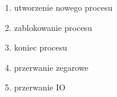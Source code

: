 \begin{enumerate}
    \item utworzenie nowego procesu
    \item zablokowanie procesu
    \item koniec procesu
    \item przerwanie zegarowe
    \item przerwanie IO
\end{enumerate}